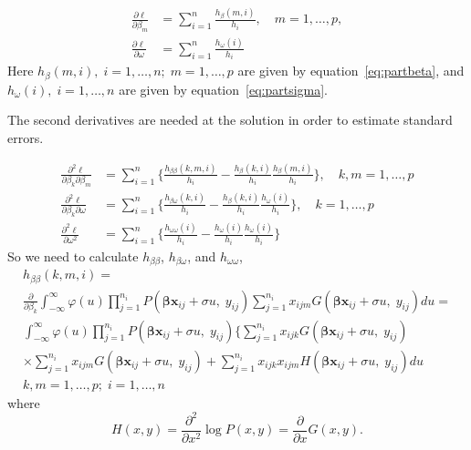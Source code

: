 \documentclass[a4paper,11pt]{article}
\newcommand{\bx}{\ensuremath{\mathbf{x}}}
\newcommand{\bb}{\ensuremath{\boldsymbol{\beta}}}
\newcommand{\Py}{\ensuremath{P(\bb\bx_{ij} + \sigma u, \; y_{ij})}}
\newcommand{\Gy}{\ensuremath{G(\bb\bx_{ij} + \sigma u, \; y_{ij})}}
\newcommand{\dGy}{\ensuremath{H(\bb\bx_{ij} + \sigma u, \; y_{ij})}}
\begin{document}
\begin{equation*}
\begin{split}
\frac{\partial \ell}{\partial \beta_m} 
&= \sum_{i=1}^n \frac{h_{\beta}(m,
  i)}{h_i}, \quad m = 1, \ldots, p,\\
\frac{\partial \ell}{\partial \omega} &= \sum_{i=1}^n \frac{h_{\omega}(i)}{h_i}
\end{split}
\end{equation*}
Here $h_{\beta}(m, i), \; i = 1, \ldots, n; \; m = 1, \ldots, p$ are given
by equation~\eqref{eq:partbeta}, and $h_{\omega}(i), \; i = 1, \ldots, n$ are
given by equation~\eqref{eq:partsigma}.

The second derivatives are needed at the solution in order to estimate
standard errors.

\begin{equation}
\begin{split}
\frac{\partial^2 \ell}{\partial \beta_k \partial \beta_m} 
&=
\sum_{i=1}^n \biggl\{\frac{h_{\beta\beta}(k, m, i)}{h_i} -
\frac{h_{\beta}(k, i)}{h_i}\frac{h_{\beta}(m, i)}{h_i}\biggr\}, \quad k, m
= 1, \ldots, p \\ 
\frac{\partial^2 \ell}{\partial \beta_k \partial \omega} &=
\sum_{i=1}^n \biggl\{\frac{h_{\beta\omega}(k, i)}{h_i} -
\frac{h_{\beta}(k, i)}{h_i}\frac{h_{\omega}(i)}{h_i}\biggr\}, \quad k = 1,
\ldots, p \\ 
\frac{\partial^2 \ell}{\partial \omega^2} &=
\sum_{i=1}^n \biggl\{\frac{h_{\omega\omega}(i)}{h_i} -
\frac{h_{\omega}(i)}{h_i}\frac{h_{\omega}(i)}{h_i}\biggr\}
\end{split}
\end{equation}
So we need to calculate $h_{\beta\beta}$,  $h_{\beta\omega}$,  and
$h_{\omega\omega}$,
\begin{multline*}
h_{\beta\beta}(k, m, i) = \\
\frac{\partial}{\partial \beta_k} \int_{-\infty}^{\infty} \varphi(u)
\prod_{j = 1}^{n_i} \Py \sum_{j=1}^{n_i}
x_{ijm} \Gy du = \\
\int_{-\infty}^{\infty} \varphi(u)
\prod_{j = 1}^{n_i} \Py \bigg\{\sum_{j=1}^{n_i}
x_{ijk} \Gy \\
\times \sum_{j=1}^{n_i} x_{ijm} \Gy
+ \sum_{j=1}^{n_i}
x_{ijk}x_{ijm} \dGy du \\
k, m = 1, \ldots, p; \; i = 1, \ldots, n
\end{multline*}
where
\begin{equation*}
H(x, y) = \frac{\partial^2}{\partial x^2} \log P(x, y) =
\frac{\partial}{\partial x} G(x, y). 
\end{equation*}
\end{document}
